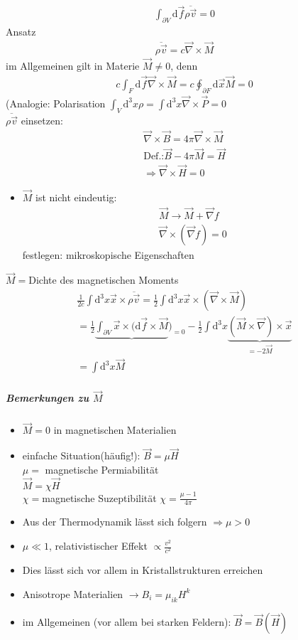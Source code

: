 \documentclass[a4paper]{article}
\begin{document}
\begin{align}
\int_{\partial V} \mathrm{d}\vec{f} \overline{\rho \vec{v}}=0
\end{align}
Ansatz
\begin{align}
\overline{\rho \vec{v}}=c\vec{\nabla}\times\vec{M}
\end{align}
im Allgemeinen gilt in Materie $\vec{M}\neq0$, denn
\begin{align}
c \int_{F} \mathrm{d}\vec{f} \vec{\nabla}\times\vec{M}=c \oint_{\partial F} \mathrm{d}\vec{x}
\vec{M}=0
\end{align}
(Analogie: Polarisation $\int_V \mathrm{d}^3x\rho=\int \mathrm{d}^3x\vec{\nabla}\times\vec{P}=0$\\
$\overline{\rho \vec{v}}$ einsetzen:
\begin{align}
\vec{\nabla}\times\vec{B}=4\pi \vec{\nabla}\times\vec{M}\\
\text{Def.:} \vec{B}-4\pi\vec{M}=\vec{H}\\
\Rightarrow \vec{\nabla}\times\vec{H}=0
\end{align}
\begin{itemize}
\item $\vec{M}$ ist nicht eindeutig:
\begin{align}
\vec{M}\rightarrow\vec{M}+\vec{\nabla}f\\
\vec{\nabla}\times(\vec{\nabla}f)=0
\end{align}
festlegen: mikroskopische Eigenschaften
\end{itemize}
$\vec{M}=$Dichte des magnetischen Moments
\begin{align}
\frac{1}{2c}\int \mathrm{d}^3x \vec{x}\times\overline{\rho\vec{v}}=\frac{1}{2}\int \mathrm{d}^3x
\vec{x}\times(\vec{\nabla}\times\vec{M})\\
=\frac{1}{2}\underbrace{\int_{\partial V}
\vec{x}\times(\mathrm{d}\vec{f}\times\vec{M}})_{=0}-\frac{1}{2}\int \mathrm{d}^3x
\underbrace{(\vec{M}\times\vec{\nabla})\times\vec{x}}_{=-2\vec{M}}\\
=\int \mathrm{d}^3x \vec{M}
\end{align}
\subparagraph{Bemerkungen zu $\vec{M}$}
\begin{itemize}
\item $\vec{M}=0$ in magnetischen Materialien
\item einfache Situation(häufig!): $\vec{B}=\mu\vec{H}$\\
$\mu=$ magnetische Permiabilität\\
$\vec{M}=\chi\vec{H}$\\
$\chi=$magnetische Suzeptibilität $\chi=\frac{\mu-1}{4\pi}$
\item Aus der Thermodynamik lässt sich folgern $\Rightarrow \mu>0$
\item $\mu \ll 1$, relativistischer Effekt $\propto \frac{v^2}{c^2}$
\item Dies lässt sich vor allem in Kristallstrukturen erreichen
\item Anisotrope Materialien $\rightarrow B_i=\mu_{ik}H^k$
\item im Allgemeinen (vor allem bei starken Feldern): $\vec{B}=\vec{B}(\vec{H})$
\end{itemize}
\end{document}
